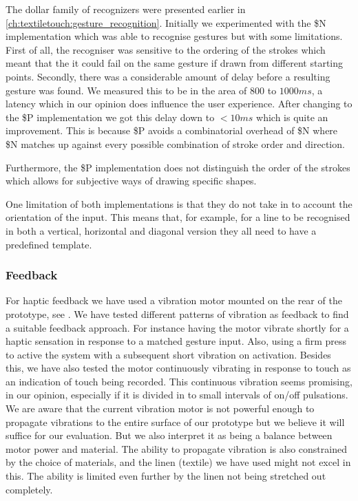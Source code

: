 The dollar family of recognizers were presented earlier in \ref{ch:textiletouch:gesture_recognition}.
Initially we experimented with the \$N implementation which was able to recognise gestures but with some limitations.
First of all, the recogniser was sensitive to the ordering of the strokes which meant that the it could fail on the same gesture if drawn from different starting points. 
Secondly, there was a considerable amount of delay before a resulting gesture was found.
We measured this to be in the area of \(800\) to \(1000 ms\), a latency which in our opinion does influence the user experience.
After changing to the \$P implementation we got this delay down to \(< 10 ms\) which is quite an improvement.
This is because \$P avoids a combinatorial overhead of \$N where \$N matches up against every possible combination of stroke order and direction.

Furthermore, the \$P implementation does not distinguish the order of the strokes which allows for subjective ways of drawing specific shapes.

One limitation of both implementations is that they do not take in to account the orientation of the input. 
This means that, for example, for a line to be recognised in both a vertical, horizontal and diagonal version they all need to have a predefined template. 

\subsubsection{Feedback} 

For haptic feedback we have used a vibration motor mounted on the rear of the prototype, see .
We have tested different patterns of vibration as feedback to find a suitable feedback approach.
For instance having the motor vibrate shortly for a haptic sensation in response to a matched gesture input. 
Also, using a firm press to active the system with a subsequent short vibration on activation.
Besides this, we have also tested the motor continuously vibrating in response to touch as an indication of touch being recorded.
This continuous vibration seems promising, in our opinion, especially if it is divided in to small intervals of on/off pulsations.
We are aware that the current vibration motor is not powerful enough to propagate vibrations to the entire surface of our prototype but we believe it will suffice for our evaluation.
But we also interpret it as being a balance between motor power and material.
The ability to propagate vibration is also constrained by the choice of materials, and the linen (textile) we have used might not excel in this.
The ability is limited even further by the linen not being stretched out completely.

